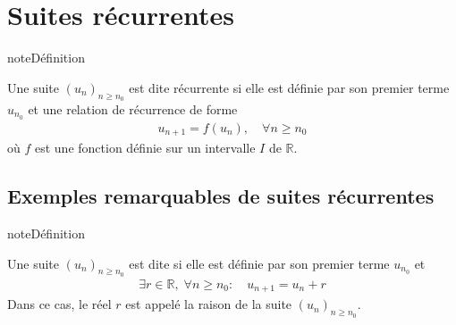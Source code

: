 \documentclass[letterpaper,10pt,french]{jupyterBook}
\begin{document}
\section{Suites récurrentes}
\label{\detokenize{suites:suites-recurrentes}}
\begin{sphinxadmonition}{note}{Définition}

\sphinxAtStartPar
Une suite \((u_n)_{n\geq n_0}\) est dite récurrente si elle est définie par son premier terme \(u_{n_0}\) et une relation de récurrence de forme
\begin{equation*}
\begin{split}
u_{n+1}=f(u_n),\quad\forall n\geq n_0
\end{split}
\end{equation*}
\sphinxAtStartPar
où \(f\) est une fonction définie sur un intervalle \(I\) de \(\mathbb{R}.\)
\end{sphinxadmonition}


\subsection{Exemples remarquables de suites récurrentes}
\label{\detokenize{suites:exemples-remarquables-de-suites-recurrentes}}
\sphinxAtStartPar
{}

\begin{sphinxadmonition}{note}{Définition}

\sphinxAtStartPar
Une suite \((u_n)_{n\geq n_0}\) est dite  si elle est définie par son premier terme \(u_{n_0}\) et
\begin{equation*}
\begin{split}
\exists r\in \mathbb{R},\;\forall n\geq n_0:\quad u_{n+1}=u_n +r
\end{split}
\end{equation*}
\sphinxAtStartPar
Dans ce cas, le réel \(r\) est appelé la raison de la suite \((u_n)_{n\geq n_0}.\)
\end{sphinxadmonition}
\end{document}
